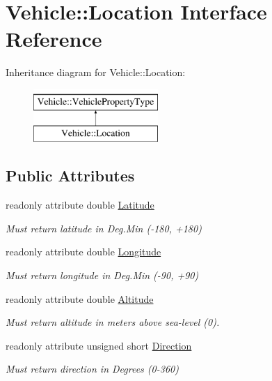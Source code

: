 \hypertarget{interfaceVehicle_1_1Location}{\section{Vehicle\-:\-:Location Interface Reference}
\label{interfaceVehicle_1_1Location}
}
Inheritance diagram for Vehicle\-:\-:Location\-:\begin{figure}[H]
\begin{center}
\leavevmode
\includegraphics[height=2.000000cm]{interfaceVehicle_1_1Location}
\end{center}
\end{figure}
\subsection*{Public Attributes}
\begin{DoxyCompactItemize}
\item 
readonly attribute double \hyperlink{interfaceVehicle_1_1Location_ad58f91b7f161b89fc27de31ef7cc140d}{Latitude}
\begin{DoxyCompactList}\small\item\em Must return latitude in Deg.\-Min (-\/180, +180) \end{DoxyCompactList}\item 
readonly attribute double \hyperlink{interfaceVehicle_1_1Location_aa6eeb442bbfcdfe357b77d0ace9ffa8e}{Longitude}
\begin{DoxyCompactList}\small\item\em Must return longitude in Deg.\-Min (-\/90, +90) \end{DoxyCompactList}\item 
readonly attribute double \hyperlink{interfaceVehicle_1_1Location_a9b727284c7d2a15fbabe955f25825573}{Altitude}
\begin{DoxyCompactList}\small\item\em Must return altitude in meters above sea-\/level (0). \end{DoxyCompactList}\item 
readonly attribute unsigned short \hyperlink{interfaceVehicle_1_1Location_af5a0e558b6f69acbededf01206746b05}{Direction}
\begin{DoxyCompactList}\small\item\em Must return direction in Degrees (0-\/360) \end{DoxyCompactList}\end{DoxyCompactItemize}
